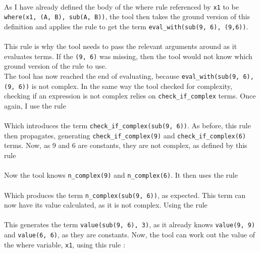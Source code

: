 
\mbox{} \\
As I have already defined the body of the where rule referenced by \lstinline{x1} to be \lstinline{where(x1, (A, B), sub(A, B))}, the tool then takes the ground version of this definition and applies the rule to get the term \lstinline{eval_with(sub(9, 6), (9,6))}. \\ \\%
This rule is why the tool needs to pass the relevant arguments around as it evaluates terms. If the \lstinline{(9, 6)} was missing, then the tool would not know which ground version of the rule to use.\\ %
The tool has now reached the end of evaluating, because \lstinline{eval_with(sub(9, 6), (9, 6))} is not complex. In the same way the tool checked for complexity, checking if an expression is not complex relies on \lstinline{check_if_complex} terms. Once again, I use the rule\\


\mbox{} \\
Which introduces the term \lstinline{check_if_complex(sub(9, 6))}. As before, this rule then propagates, generating \lstinline{check_if_complex(9)} and \lstinline{check_if_complex(6)} terms. Now, as 9 and 6 are constants, they are not complex, as defined by this rule \\ %


\mbox{} \\
Now the tool knows \lstinline{n_complex(9)} and \lstinline{n_complex(6)}. It then uses the rule \\ %


\mbox{} \\
Which produces the term \lstinline{n_complex(sub(9, 6))}, as expected. This term can now have its value calculated, as it is not complex. Using the rule \\ %


\mbox{} \\
This generates the term \lstinline{value(sub(9, 6), 3)}, as it already knows \lstinline{value(9, 9)} and \lstinline{value(6, 6)}, as they are constants. Now, the tool can work out the value of the where variable, \lstinline{x1}, using this rule : \\

